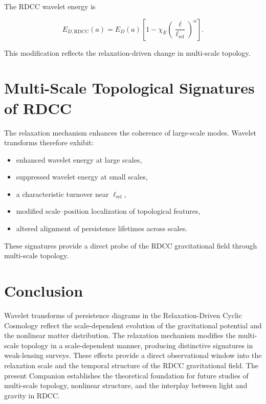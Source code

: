 \documentclass[11pt,a4paper]{article}
\begin{document}
The RDCC wavelet energy is

\begin{equation}
    E_{D,\mathrm{RDCC}}(a)
    = E_{D}(a)
      \left[
        1 - \chi_{E}
        \left(\frac{\ell}{\ell_{\mathrm{rel}}}\right)^{\alpha}
      \right].
\end{equation}

This modification reflects the relaxation-driven change in multi-scale topology.
\section{Multi-Scale Topological Signatures of RDCC}

The relaxation mechanism enhances the coherence of large-scale modes. Wavelet 
transforms therefore exhibit:

\begin{itemize}
    \item enhanced wavelet energy at large scales,
    \item suppressed wavelet energy at small scales,
    \item a characteristic turnover near $\ell_{\mathrm{rel}}$,
    \item modified scale–position localization of topological features,
    \item altered alignment of persistence lifetimes across scales.
\end{itemize}

These signatures provide a direct probe of the RDCC gravitational field through 
multi-scale topology.
\section{Conclusion}

Wavelet transforms of persistence diagrams in the Relaxation-Driven Cyclic 
Cosmology reflect the scale-dependent evolution of the gravitational potential and 
the nonlinear matter distribution. The relaxation mechanism modifies the multi-
scale topology in a scale-dependent manner, producing distinctive signatures in 
weak-lensing surveys. These effects provide a direct observational window into the 
relaxation scale and the temporal structure of the RDCC gravitational field. The 
present Companion establishes the theoretical foundation for future studies of 
multi-scale topology, nonlinear structure, and the interplay between light and 
gravity in RDCC.


\nocite{*}

\end{document}
